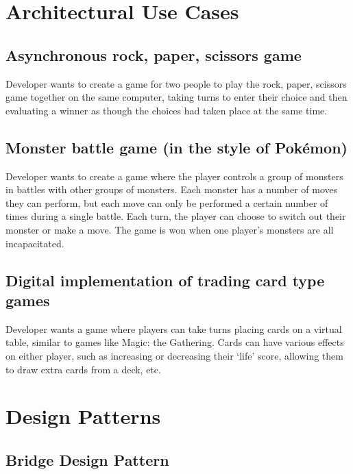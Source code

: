 \documentclass[11pt]{report}
\begin{document}
\section{Architectural Use Cases}
	\subsection{Asynchronous rock, paper, scissors game}
	Developer wants to create a game for two people to play the rock, paper, scissors game together on the same computer, taking turns to enter their choice and then evaluating a winner as though the choices had taken place at the same time. 
	\subsection{Monster battle game (in the style of Pok\'{e}mon\textregistered)}
	Developer wants to create a game where the player controls a group of monsters in battles with other groups of monsters. Each monster has a number of moves they can perform, but each move can only be performed a certain number of times during a single battle. Each turn, the player can choose to switch out their monster or make a move. The game is won when one player’s monsters are all incapacitated.
	\subsection{Digital implementation of trading card type games}
	Developer wants a game where players can take turns placing cards on a virtual table, similar to games like Magic: the Gathering. Cards can have various effects on either player, such as increasing or decreasing their ‘life’ score, allowing them to draw extra cards from a deck, etc.

\section{Design Patterns}
	\subsection{Bridge Design Pattern}
	
\end{document}
